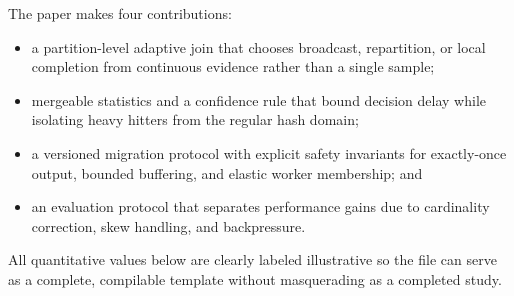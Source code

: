 The paper makes four contributions:

\begin{itemize}[leftmargin=*,itemsep=2pt,topsep=3pt]
  \item a partition-level adaptive join that chooses broadcast, repartition,
    or local completion from continuous evidence rather than a single sample;
  \item mergeable statistics and a confidence rule that bound decision delay
    while isolating heavy hitters from the regular hash domain;
  \item a versioned migration protocol with explicit safety invariants for
    exactly-once output, bounded buffering, and elastic worker membership; and
  \item an evaluation protocol that separates performance gains due to
    cardinality correction, skew handling, and backpressure.
\end{itemize}

All quantitative values below are clearly labeled illustrative so the file can
serve as a complete, compilable template without masquerading as a completed
study.
